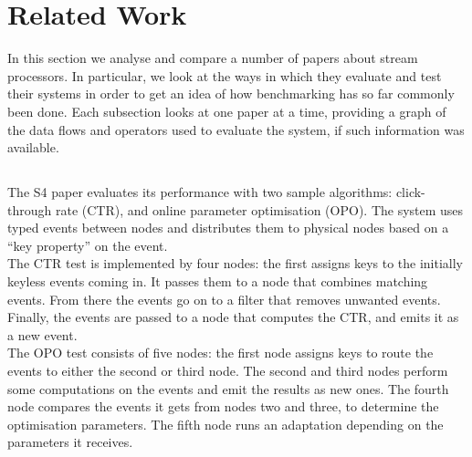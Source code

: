 \section{Related Work}
In this section we analyse and compare a number of papers about stream processors. In particular, we look at the ways in which they evaluate and test their systems in order to get an idea of how benchmarking has so far commonly been done. Each subsection looks at one paper at a time, providing a graph of the data flows and operators used to evaluate the system, if such information was available.

\subsection{}
The S4 paper evaluates its performance with two sample algorithms: click-through rate (CTR), and online parameter optimisation (OPO). The system uses typed events between nodes and distributes them to physical nodes based on a ``key property'' on the event. \\

The CTR test is implemented by four nodes: the first assigns keys to the initially keyless events coming in. It passes them to a node that combines matching events. From there the events go on to a filter that removes unwanted events. Finally, the events are passed to a node that computes the CTR, and emits it as a new event. \\

The OPO test consists of five nodes: the first node assigns keys to route the events to either the second or third node. The second and third nodes perform some computations on the events and emit the results as new ones. The fourth node compares the events it gets from nodes two and three, to determine the optimisation parameters. The fifth node runs an adaptation depending on the parameters it receives.


\subsection{}

